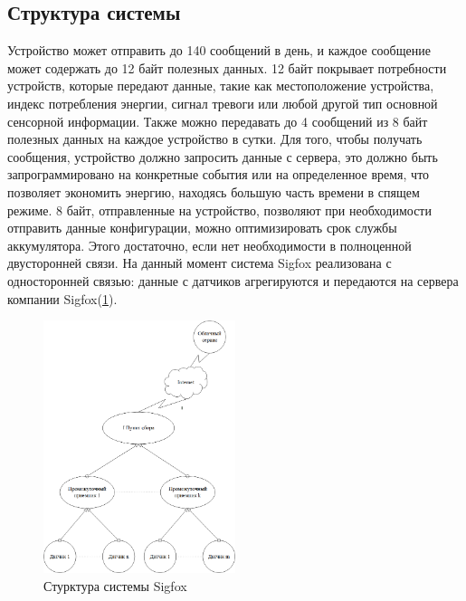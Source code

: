 \subsection{Структура системы}
Устройство может отправить до 140 сообщений в день, и каждое сообщение может содержать до 12 байт полезных данных. 12 байт покрывает потребности устройств, которые передают данные, такие как местоположение устройства, индекс потребления энергии, сигнал тревоги или любой другой тип основной сенсорной информации. 
Также можно передавать до 4 сообщений из 8 байт полезных данных на каждое устройство в сутки. Для того, чтобы получать сообщения, устройство должно запросить данные с сервера, это должно быть запрограммировано на конкретные события или на определенное время, что позволяет экономить энергию, находясь большую часть времени в спящем режиме. 8 байт, отправленные на устройство, позволяют при необходимости отправить данные конфигурации, можно оптимизировать срок службы аккумулятора. Этого достаточно, если нет необходимости в полноценной двусторонней связи. На данный момент система Sigfox реализована с односторонней связью: данные с датчиков агрегируются и передаются на сервера компании Sigfox(\ref{fig:img11}). 
\begin{figure}[H]
	\centering
	\includegraphics[width=0.5\textwidth]{img/kich_bur/11.png}
	\caption{Стурктура системы Sigfox}
	\label{fig:img11}
\end{figure}
